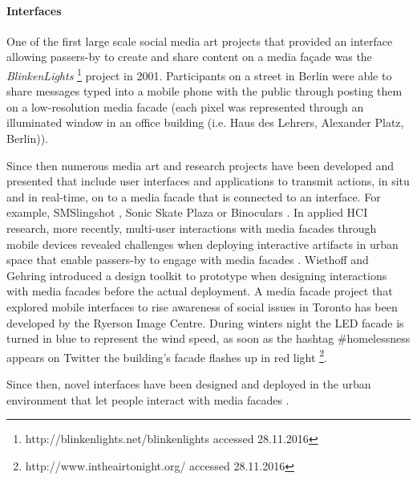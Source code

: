 
\paragraph{Interfaces}

One of the first large scale social media art projects that provided an interface allowing passers-by to create and share content on a media façade was the \textit{BlinkenLights}  \footnote{http://blinkenlights.net/blinkenlights accessed 28.11.2016} project in 2001. Participants on a street in Berlin were able to share messages typed into a mobile phone with the public through posting them on a low-resolution media facade (each pixel was represented through an illuminated window in an office building (i.e. Haus des Lehrers, Alexander Platz, Berlin)). 

Since then numerous media art and research projects have been developed and presented that include user interfaces and applications to transmit actions, in situ and in real-time, on to a media facade that is connected to an interface. 
For example, SMSlingshot \cite{Fischer_2012}, Sonic Skate Plaza \cite{Serret_2013} or Binoculars \cite{Guljajeva_2013}.
In applied HCI research, more recently, multi-user interactions with media facades through mobile devices revealed challenges when deploying interactive artifacts in urban space that enable passers-by to engage with media facades \cite{Boring2011}. 
Wiethoff and Gehring \cite{Wiethoff2012} introduced a design toolkit to prototype when designing interactions with media facades before the actual deployment. 
 A media facade project that explored mobile interfaces to rise awareness of social issues in Toronto has been developed by the Ryerson Image Centre. During winters night the LED facade is turned in blue to represent the wind speed, as soon as the hashtag \#homelessness appears on Twitter the building's facade flashes up in red light \footnote{http://www.intheairtonight.org/ accessed 28.11.2016}. 

Since then, novel interfaces have been designed and deployed in the urban environment that let people interact with media facades \cite{Hoggenmueller_2014}.


